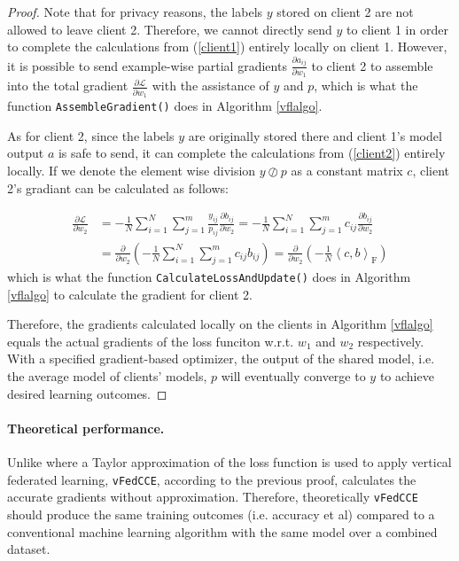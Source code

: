 \documentclass{article}
\begin{document}
\begin{proof}
Note that for privacy reasons, the labels $y$ stored on client 2 are not allowed to leave client 2. Therefore, we cannot directly send $y$ to client 1 in order to complete the calculations from (\ref{client1}) entirely locally on client 1. However, it is possible to send example-wise partial gradients $\frac{\partial a_{ij}}{\partial w_1}$ to client 2 to assemble into the total gradient $\frac{\partial\mathcal{L}}{\partial w_1}$ with the assistance of $y$ and $p$, which is what the function \texttt{AssembleGradient()} does in Algorithm \ref{vflalgo}.

As for client 2, since the labels $y$ are originally stored there and client 1's model output $a$ is safe to send, it can complete the calculations from (\ref{client2}) entirely locally. If we denote the element wise division $y\oslash p$ as a constant matrix $c$, client 2's gradiant can be calculated as follows:

\begin{align*}
  \frac{\partial\mathcal{L}}{\partial w_2}&=-\frac{1}{N}\sum_{i=1}^N \sum_{j=1}^m\frac{y_{ij}}{p_{ij}}\frac{\partial b_{ij}}{\partial w_2}=-\frac{1}{N}\sum_{i=1}^N \sum_{j=1}^m c_{ij}\frac{\partial b_{ij}}{\partial w_2}\\
  &=\frac{\partial}{\partial w_2}\left(-\frac{1}{N}\sum_{i=1}^N\sum_{j=1}^m c_{ij} b_{ij}\right)
  =\frac{\partial}{\partial w_2}\left(-\frac{1}{N}\left\langle c,b\right\rangle_\mathrm{F}\right)
\end{align*} which is what the function \texttt{CalculateLossAndUpdate()} does in Algorithm \ref{vflalgo} to calculate the gradient for client 2.

Therefore, the gradients calculated locally on the clients in Algorithm \ref{vflalgo} equals the actual gradients of the loss funciton w.r.t. $w_1$ and $w_2$ respectively. With a specified gradient-based optimizer, the output of the shared model, i.e. the average model of clients' models, $p$ will eventually converge to $y$ to achieve desired learning outcomes.
\end{proof}

\paragraph{Theoretical performance.} Unlike \cite{hardy2017private} where a Taylor approximation of the loss function is used to apply vertical federated learning, \texttt{vFedCCE}, according to the previous proof, calculates the accurate gradients without approximation. Therefore, theoretically \texttt{vFedCCE} should produce the same training outcomes (i.e. accuracy et al) compared to a conventional machine learning algorithm with the same model over a combined dataset.
\end{document}
